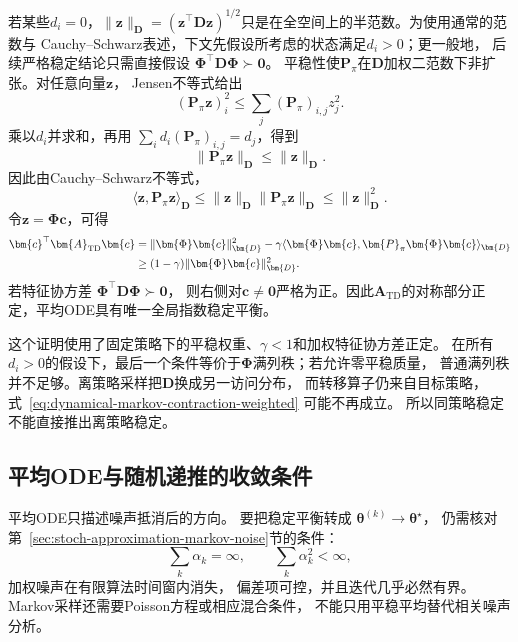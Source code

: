 若某些$d_i=0$，$\lVert\bm{z}\rVert_{\bm D}
=(\bm z^\top\bm D\bm z)^{1/2}$只是在全空间上的半范数。为使用通常的范数与
Cauchy--Schwarz表述，下文先假设所考虑的状态满足$d_i>0$；更一般地，
后续严格稳定结论只需直接假设
$\bm\Phi^\top\bm D\bm\Phi\succ\bm0$。
平稳性使$\bm{P}_{\pi}$在$\bm{D}$加权二范数下非扩张。对任意向量$\bm{z}$，
Jensen不等式给出
\[
	(\bm{P}_{\pi}\bm{z})_{i}^{2}
	\leq \sum_{j}(\bm{P}_{\pi})_{i,j}z_{j}^{2}.
\]
乘以$d_{i}$并求和，再用
$\sum_{i}d_{i}(\bm{P}_{\pi})_{i,j}=d_{j}$，得到
\begin{equation}
	\lVert\bm{P}_{\pi}\bm{z}\rVert_{\bm{D}}\leq \lVert\bm{z}\rVert_{\bm{D}}. \label{eq:dynamical-markov-contraction-weighted}
\end{equation}
因此由Cauchy--Schwarz不等式，
\[
	\langle\bm{z},\bm{P}_{\pi}\bm{z}\rangle_{\bm{D}}
	\leq \lVert\bm{z}\rVert_{\bm{D}}\lVert
	\bm{P}_{\pi}\bm{z}\rVert_{\bm{D}}
	\leq \lVert\bm{z}\rVert_{\bm{D}}^{2}.
\]
令$\bm{z}=\bm{\Phi}\bm{c}$，可得
\begin{align}
	\bm{c}^{\top}\bm{A}_{\mathrm{TD}}\bm{c}
	& = \lVert\bm{\Phi}\bm{c}\rVert_{\bm{D}}^{2}
	- \gamma \langle \bm{\Phi}\bm{c},
	\bm{P}_{\pi}\bm{\Phi}\bm{c}\rangle_{\bm{D}}\notag \\
	                          & \geq (1-\gamma) \lVert\bm{\Phi}\bm{c}\rVert_{\bm{D}}^{2}. \label{eq:dynamical-td-positive-drift}
\end{align}
若特征协方差 $\bm{\Phi}^{\top}\bm{D}\bm{\Phi}\succ\bm{0}$， 则右侧对$\bm{c}\neq\bm
{0}$严格为正。因此$\bm{A}_{\mathrm{TD}}$的对称部分正定，平均ODE具有唯一全局指数稳定平衡。

这个证明使用了固定策略下的平稳权重、$\gamma<1$和加权特征协方差正定。
在所有$d_i>0$的假设下，最后一个条件等价于$\bm\Phi$满列秩；若允许零平稳质量，
普通满列秩并不足够。离策略采样把$\bm{D}$换成另一访问分布，
而转移算子仍来自目标策略， 式~\eqref{eq:dynamical-markov-contraction-weighted}
可能不再成立。 所以同策略稳定不能直接推出离策略稳定。

\subsection{平均ODE与随机递推的收敛条件}

平均ODE只描述噪声抵消后的方向。 要把稳定平衡转成
$\bm{\theta}^{(k)}\to\bm{\theta}^{\star}$， 仍需核对第~\ref{sec:stoch-approximation-markov-noise}节的条件：
\[
	\sum_{k}\alpha_{k}=\infty, \qquad \sum_{k}\alpha_{k}^{2}<\infty,
\]
加权噪声在有限算法时间窗内消失， 偏差项可控，并且迭代几乎必然有界。
Markov采样还需要Poisson方程或相应混合条件， 不能只用平稳平均替代相关噪声分析。

